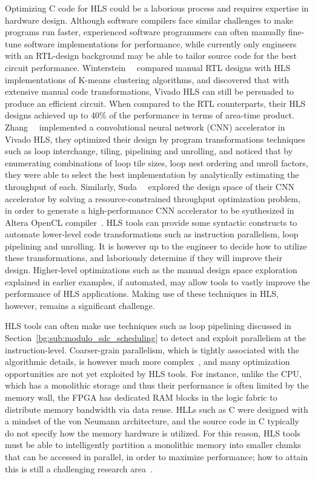 Optimizing C code for HLS could be a laborious process and requires expertise
in hardware design.  Although software compilers face similar challenges to
make programs run faster, experienced software programmers can often manually
fine-tune software implementations for performance, while currently only
engineers with an RTL-design background may be able to tailor source code
for the best circuit performance.  Winterstein~\etal~\cite{felix13} compared
manual RTL designs with HLS implementations of K-means clustering algorithms,
and discovered that with extensive manual code transformations, Vivado HLS can
still be persuaded to produce an efficient circuit.  When compared to the RTL
counterparts, their HLS designs achieved up to 40\% of the performance in terms
of area-time product.  Zhang~\etal~\cite{zhang15} implemented a convolutional
neural network (CNN) accelerator in Vivado HLS, they optimized their design by
program transformations techniques such as loop interchange, tiling, pipelining
and unrolling, and noticed that by enumerating combinations of loop tile sizes,
loop nest ordering and unroll factors, they were able to select the best
implementation by analytically estimating the throughput of each.  Similarly,
Suda~\etal~\cite{suda16} explored the design space of their CNN accelerator
by solving a resource-constrained throughput optimization problem, in order
to generate a high-performance CNN accelerator to be synthesized in Altera
OpenCL compiler~\cite{aoc}.  HLS tools can provide some syntactic constructs
to automate lower-level code transformations such as instruction parallelism,
loop pipelining and unrolling.  It is however up to the engineer to decide
how to utilize these transformations, and laboriously determine if they will
improve their design.  Higher-level optimizations such as the manual design
space exploration explained in earlier examples, if automated, may allow tools
to vastly improve the performance of HLS applications.  Making use of these
techniques in HLS, however, remains a significant challenge.

HLS tools can often make use techniques such as loop pipelining discussed in
Section~\ref{bg:sub:modulo_sdc_scheduling} to detect and exploit parallelism at
the instruction-level.  Coarser-grain parallelism, which is tightly associated
with the algorithmic details, is however much more complex~\cite{nane15},
and many optimization opportunities are not yet exploited by HLS tools.  For
instance, unlike the CPU, which has a monolithic storage and thus their
performance is often limited by the memory wall, the FPGA has dedicated RAM
blocks in the logic fabric to distribute memory bandwidth via data reuse.  HLLs
such as C were designed with a mindset of the von Neumann architecture, and the
source code in C typically do not specify how the memory hardware is utilized.
For this reason, HLS tools must be able to intelligently partition a monolithic
memory into smaller chunks that can be accessed in parallel, in order to
maximize performance; how to attain this is still a challenging research
area~\cite{cong11, cong12, wang13, felix15}.

